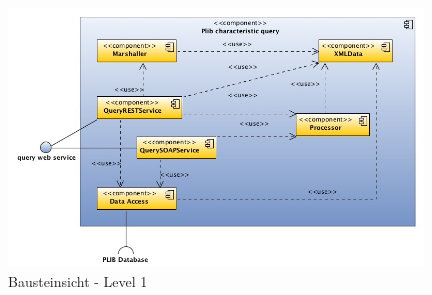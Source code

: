 \begin{figure}[htbp]
	\centering
		\includegraphics[width=0.98\textwidth]{images/bausteinsicht_plib_level1.jpg}
	\caption{Bausteinsicht - Level 1}
	\label{fig:bausteinsicht_level1}
\end{figure}

